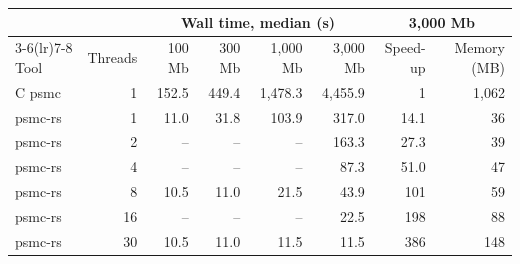 \begin{tabular}{lrrrrrrr}
\toprule
& & \multicolumn{4}{c}{Wall time, median (s)} & \multicolumn{2}{c}{3,000 Mb} \\
\cmidrule(lr){3-6}\cmidrule(lr){7-8}
Tool & Threads & 100 Mb & 300 Mb & 1,000 Mb & 3,000 Mb & Speed-up & Memory (MB) \\
\midrule
C psmc & 1 & 152.5 & 449.4 & 1,478.3 & 4,455.9 & 1 & 1,062 \\
psmc-rs & 1 & 11.0 & 31.8 & 103.9 & 317.0 & 14.1 & 36 \\
psmc-rs & 2 & -- & -- & -- & 163.3 & 27.3 & 39 \\
psmc-rs & 4 & -- & -- & -- & 87.3 & 51.0 & 47 \\
psmc-rs & 8 & 10.5 & 11.0 & 21.5 & 43.9 & 101 & 59 \\
psmc-rs & 16 & -- & -- & -- & 22.5 & 198 & 88 \\
psmc-rs & 30 & 10.5 & 11.0 & 11.5 & 11.5 & 386 & 148 \\
\bottomrule
\end{tabular}
